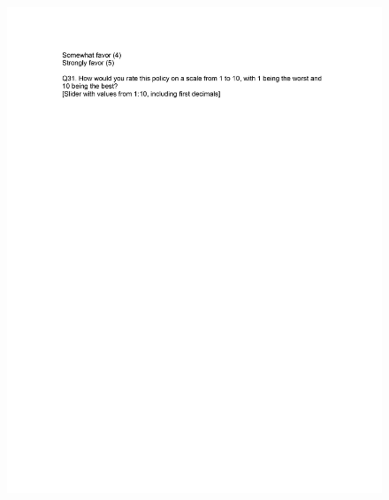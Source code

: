 \documentclass[12pt,econ]{sources/authesis}
\makeatletter
\def\maxwidth{\ifdim\Gin@nat@width>\linewidth\linewidth
\else\Gin@nat@width\fi}
\let\Oldincludegraphics\includegraphics
\renewcommand{\includegraphics}[1]{\Oldincludegraphics[width=\maxwidth]{#1}}
\makeatother
\begin{document}
\begin{figure}[hbt]
  \centering
\includegraphics{data/framing/appendix/questionnaire/questionnaire19.jpg}
\end{figure}
\end{document}
